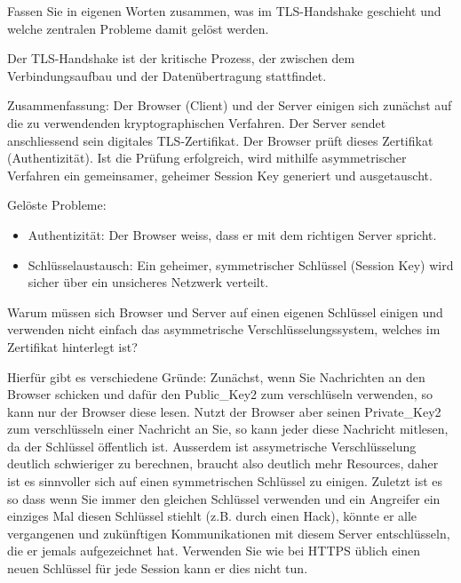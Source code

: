         \begin{myexercise}
            Fassen Sie in eigenen Worten zusammen, was im TLS-Handshake geschieht und welche zentralen Probleme damit gelöst werden.
            \begin{myanswer}
                Der TLS-Handshake ist der kritische Prozess, der zwischen dem Verbindungsaufbau und der Datenübertragung stattfindet.

                Zusammenfassung: Der Browser (Client) und der Server einigen sich zunächst auf die zu verwendenden kryptographischen Verfahren. Der Server sendet anschliessend sein digitales TLS-Zertifikat. Der Browser prüft dieses Zertifikat (Authentizität). Ist die Prüfung erfolgreich, wird mithilfe asymmetrischer Verfahren ein gemeinsamer, geheimer Session Key generiert und ausgetauscht.

                Gelöste Probleme: 
                \begin{itemize}
                    \item Authentizität: Der Browser weiss, dass er mit dem richtigen Server spricht.
                    \item Schlüsselaustausch: Ein geheimer, symmetrischer Schlüssel (Session Key) wird sicher über ein unsicheres Netzwerk verteilt.
                \end{itemize}
            \end{myanswer}
        \end{myexercise}

        \begin{myexercise}
            Warum müssen sich Browser und Server auf einen eigenen Schlüssel einigen und verwenden nicht einfach das asymmetrische Verschlüsselungssystem, welches im Zertifikat hinterlegt ist? 
            \begin{myanswer}
                Hierfür gibt es verschiedene Gründe: 
                Zunächst, wenn Sie Nachrichten an den Browser schicken und dafür den Public\_Key2 zum verschlüseln verwenden, so kann nur der Browser diese lesen. Nutzt der Browser aber seinen Private\_Key2 zum verschlüsseln einer Nachricht an Sie, so kann jeder diese Nachricht mitlesen, da der Schlüssel öffentlich ist. 
                Ausserdem ist assymetrische Verschlüsselung deutlich schwieriger zu berechnen, braucht also deutlich mehr Resources, daher ist es sinnvoller sich auf einen symmetrischen Schlüssel zu einigen. 
                Zuletzt ist es so dass wenn Sie immer den gleichen Schlüssel verwenden und ein Angreifer ein einziges Mal diesen Schlüssel stiehlt (z.B. durch einen Hack), könnte er alle vergangenen und zukünftigen Kommunikationen mit diesem Server entschlüsseln, die er jemals aufgezeichnet hat. Verwenden Sie wie bei HTTPS üblich einen neuen Schlüssel für jede Session kann er dies nicht tun. 
            \end{myanswer}
        \end{myexercise}

